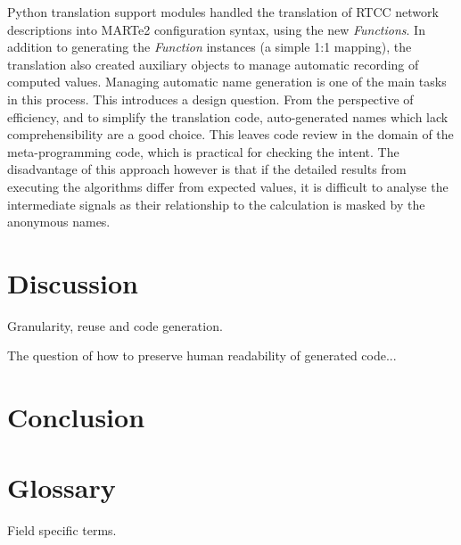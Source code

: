 \documentclass[preprint,12pt]{elsarticle}
\begin{document}
Python translation support modules handled the translation of RTCC network 
descriptions into MARTe2 configuration syntax, using the new {\em Functions}.
In addition to generating the {\em Function} instances (a simple 1:1 mapping),
the translation also created auxiliary objects to manage automatic
recording of computed values.  Managing automatic name generation is one
of the main tasks in this process.  This introduces a design question.  From
the perspective of efficiency, and to simplify the translation code, 
auto-generated names which lack comprehensibility are a good choice. 
This leaves code review in the domain of the meta-programming code, 
which is practical for checking the intent.  The disadvantage of this
approach however is that if the detailed results from executing the 
algorithms differ from expected values, it is difficult to analyse
the intermediate signals as their relationship to the calculation is
masked by the anonymous names.


\section{Discussion}

Granularity, reuse and code generation.

The question of how to preserve human readability of generated code...

\section{Conclusion}



\section{Glossary}

Field specific terms.
\end{document}
